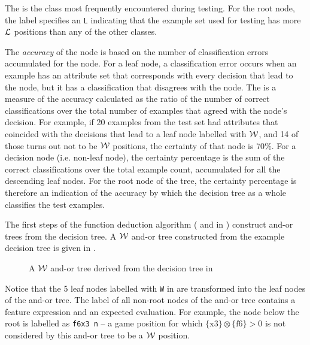 The  is the class most frequently encountered during testing. For the root node, the label specifies an {\tt L} indicating that the example set used for testing has more ${\mathcal L}$ positions than any of the other classes.     

The {\sl accuracy} of the node is based on the number of classification errors accumulated for the node. For a leaf node, a classification error occurs when an example has an attribute set that corresponds with every decision that lead to the node, but it has a classification that disagrees with the node. The  is a measure of the accuracy calculated as the ratio of the number of correct classifications over the total number of examples that agreed with the node's decision. For example, if 20 examples from the test set had attributes that coincided with the decisions that lead to a leaf node labelled with ${\mathcal W}$, and 14 of those turns out not to be ${\mathcal W}$ positions, the certainty of that node is $70\%$. For a decision node (i.e. non-leaf node), the certainty percentage is the sum of the correct classifications over the total  example count, accumulated for all the  descending leaf nodes. For the root node of the tree, the certainty percentage is therefore an indication of the accuracy by which the decision tree as a whole classifies the test examples.   

The first steps of the function deduction algorithm ( and  in ) construct and-or trees from the decision tree. A ${\mathcal W}$ and-or tree constructed from the example decision tree is given in .   
\begin{figure} [ht]
\center
\tiny
{}
{
	{
		{
		{
			{
				{
					{
						{
							{
								{
									{
										{
										}
									}
								}
							{}
							}
						}
					}
				}
			}
		}
	}
}
}
\caption{A ${\mathcal W}$ and-or tree derived from the decision tree in }
\label{fig:wintree_minimal}
\end{figure}
Notice that the 5 leaf nodes labelled with {\tt W} in  are transformed into the leaf nodes of the and-or tree. The label of all non-root nodes of the and-or tree contains a feature expression and an expected evaluation. For example, the node below the root is labelled as {\tt f6x3 n} -- a game position for which $\{\mbox{x3}\} \otimes \{\mbox{f6}\} > 0$ is not considered by this and-or tree to be a ${\mathcal W}$ position.  


